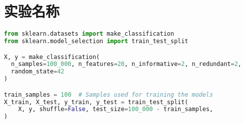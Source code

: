 \documentclass{whureport}
\title{\homeworkname}
\date{}
\begin{document}
\makecover


\section{实验名称}

\begin{lstlisting}[language=python]
from sklearn.datasets import make_classification
from sklearn.model_selection import train_test_split

X, y = make_classification(
  n_samples=100_000, n_features=20, n_informative=2, n_redundant=2,
  random_state=42
)

train_samples = 100  # Samples used for training the models
X_train, X_test, y_train, y_test = train_test_split(
    X, y, shuffle=False, test_size=100_000 - train_samples,
)
\end{lstlisting}




\makeend
\end{document}
